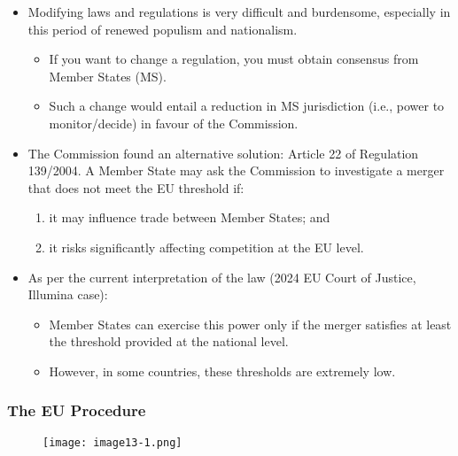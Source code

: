         \begin{itemize}
            \item Modifying laws and regulations is very difficult and burdensome, especially in this period of renewed populism and nationalism.
            \begin{itemize}
                \item If you want to change a regulation, you must obtain consensus from Member States (MS).
                \item Such a change would entail a reduction in MS jurisdiction (i.e., power to monitor/decide) in favour of the Commission.
            \end{itemize}
        
            \item The Commission found an alternative solution: Article 22 of Regulation 139/2004. A Member State may ask the Commission to investigate a merger that does not meet the EU threshold if:
            \begin{enumerate}
                \item it may influence trade between Member States; and
                \item it risks significantly affecting competition at the EU level.
            \end{enumerate}
            
            \item As per the current interpretation of the law (2024 EU Court of Justice, Illumina case):
            \begin{itemize}
                \item Member States can exercise this power only if the merger satisfies at least the threshold provided at the national level.
                \item However, in some countries, these thresholds are extremely low.
            \end{itemize}
        \end{itemize}

        \subsubsection*{The EU Procedure}

            \begin{figure}[ht]
                \centering
                \texttt{[image: image13-1.png]}
            \end{figure}


